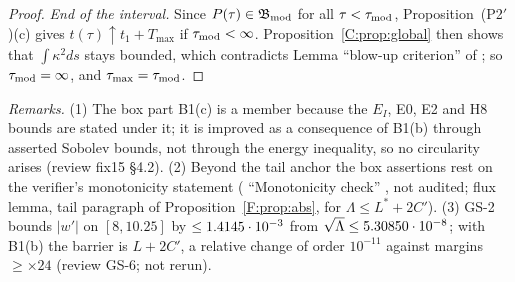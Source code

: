 \documentclass[11pt]{article}
\begin{document}
\begin{proof}
\emph{End of the interval.} Since $P(\tau)\in\mathfrak B_{\rm mod}$ for all $\tau<\tau_{\rm mod}$, Proposition~(P2$'$)(c) gives $t(\tau)\uparrow t_1+T_{\max}$ if $\tau_{\rm mod}<\infty$. Proposition~\ref{C:prop:global} then shows that $\int\kappa^2ds$ stays bounded, which contradicts Lemma ``blow-up criterion'' of ; so $\tau_{\rm mod}=\infty$, and $\tau_{\max}=\tau_{\rm mod}$.
\end{proof}
\noindent\emph{Remarks.} (1) The box part B1(c) is a member because the $E_I$, E0, E2 and H8 bounds are stated under it; it is improved as a consequence of B1(b) through asserted Sobolev bounds, not through the energy inequality, so no circularity arises (review fix15 \S4.2). (2) Beyond the tail anchor the box assertions rest on the verifier's monotonicity statement ( ``Monotonicity check'' \tR, not audited; flux lemma, tail paragraph of Proposition~\ref{F:prop:abs}, for $\Lambda\le L^*+2C'$). (3) GS-2 bounds $|w'|$ on $[8,10.25]$ by $\le1.4145\cdot10^{-3}$ from $\sqrt\Lambda\le5.30850\cdot10^{-8}$; with B1(b) the barrier is $L+2C'$, a relative change of order $10^{-11}$ against margins $\ge\times24$ (review GS-6; not rerun).
\ifdefined\stepmain\else
\end{document}

